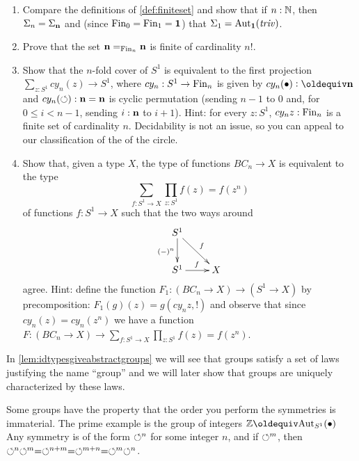 \begin{xca}
  \begin{enumerate}
  \item Compare the definitions of \cref{def:finiteset} and show that if $n:\mathbb{N}$, then $\Sigma_n=\Sigma_{\mathbf{n} }$ %
and (since $\operatorname{Fin}_0=\operatorname{Fin}_1=\mathbf{1}$) that $\Sigma_{1}=\mathrm{Aut}_{\mathbf{1} }(\mathop{\mathit{triv}})$.
\item Prove that the set $\mathbf{n} =_{\operatorname{Fin}_n}\mathbf{n} $ is finite of cardinality $n!$.
\item Show that the $n$-fold cover of $S^1$ is equivalent to the first projection $\sum_{z:S^1}cy_n(z)\to S^1$, where $cy_n:S^1\to\operatorname{Fin}_n$ is given by $cy_n(\base)\defequi\bn n$ and $cy_n(\circlearrowleft):\mathbf{n}=\mathbf{n}$ is cyclic permutation (sending $n-1$ to $0$ and, for $0\leq i<n-1$, sending $i:\mathbf{n}$ to $i+1$).  Hint: for every $z:S^1$, $cy_nz:\operatorname{Fin}_n$ is a finite set of cardinality $n$.  Decidability is not an issue, so you can appeal to our classification of the \coverings of the circle.
\item Show that, given a type $X$, the type of functions $BC_n\to X$ is equivalent to the type 
$$\sum_{f:S^1\to X}\prod_{z:S^1}f(z)=f(z^n)$$ of functions $f:S^1\to X$ such that the two ways around
$$\xymatrix{S^1\ar[d]_{(-)^n}\ar[dr]^f&\\S^1\ar[r]^f&X}$$
agree.  Hint: define the function $F_1:(BC_n\to X)\to (S^1\to X)$ by precomposition: $F_1(g)(z)=g(cy_nz,!)$ and observe that since $cy_n(z)=cy_n(z^n)$ we have a function $F:(BC_n\to X)\to \sum_{f:S^1\to X}\prod_{z:S^1}f(z)=f(z^n)$.
  \end{enumerate} 
\end{xca}

\begin{remark}
In \cref{lem:idtypesgiveabstractgroups} we will see that groups satisfy a set of laws justifying the name ``group''
and we will later show that groups are uniquely characterized by these laws.
\end{remark}
Some groups have the property that the order you perform the symmetries is immaterial.  The prime example is the group of integers $\ZZ\oldequiv \aut_{S^1}(\base)$  Any symmetry is of the form $\circlearrowleft^n$ for some integer $n$, and if $\circlearrowleft^m$, then $\circlearrowleft^n\circlearrowleft^m=\circlearrowleft^{n+m}=\circlearrowleft^{m+n}=\circlearrowleft^m\circlearrowleft^n$.

